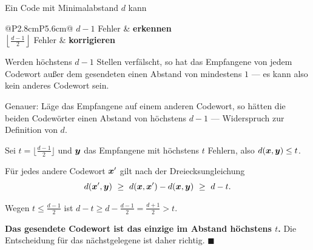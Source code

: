 \begin{merksatz}
Ein Code mit Minimalabstand $d$ kann
\begin{center}
{\small
\renewcommand{\arraystretch}{1.5}
\begin{tabular}{@{}P{2.8cm}P{5.6cm}@{}}
\toprule
$d-1$ Fehler & \textbf{erkennen}\\
$\left\lfloor\frac{d-1}{2}\right\rfloor$ Fehler & \textbf{korrigieren}\\
\bottomrule
\end{tabular}}
\end{center}

Werden höchstens $d-1$ Stellen verfälscht, so hat das Empfangene von jedem Codewort außer dem gesendeten einen Abstand von mindestens $1$ --- es kann also kein anderes Codewort sein.

Genauer: Läge das Empfangene auf einem anderen Codewort, so hätten die beiden Codewörter einen Abstand von höchstens $d-1$ --- Widerspruch zur Definition von $d$. \checkmark

Sei $t = \lfloor\frac{d-1}{2}\rfloor$ und $\boldsymbol{y}$ das Empfangene mit höchstens $t$ Fehlern, also $d(\boldsymbol{x},\boldsymbol{y}) \le t$.

Für jedes andere Codewort $\boldsymbol{x}'$ gilt nach der Dreiecksungleichung
\[ d(\boldsymbol{x}',\boldsymbol{y}) \ \ge\ d(\boldsymbol{x},\boldsymbol{x}') - d(\boldsymbol{x},\boldsymbol{y}) \ \ge\ d - t . \]

Wegen $t \le \frac{d-1}{2}$ ist $d-t \ge d - \frac{d-1}{2} = \frac{d+1}{2} > t$.

\begin{center}
\begin{minipage}{0.9\textwidth}
\textbf{Das gesendete Codewort ist das einzige im Abstand höchstens $t$.} Die Entscheidung für das nächstgelegene ist daher richtig. $\blacksquare$
\end{minipage}
\end{center}

\begin{center}
\begin{minipage}{0.88\textwidth}
\end{minipage}
\end{center}
\end{merksatz}

